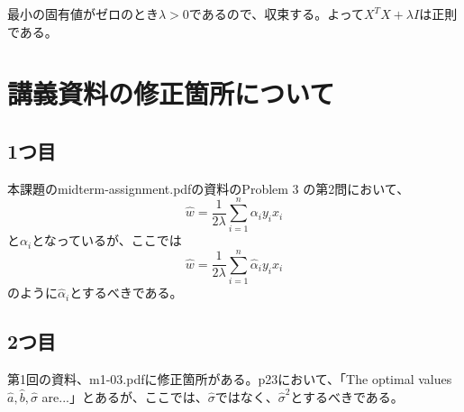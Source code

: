 \documentclass[a4j,11pt]{jarticle}
\begin{document}
最小の固有値がゼロのとき$\lambda > 0$であるので、収束する。よって$X^TX + \lambda I$は正則である。


\section*{講義資料の修正箇所について}
\subsection*{1つ目}
本課題のmidterm-assignment.pdfの資料のProblem 3 の第2問において、
\begin{equation*}
    \hat{w} = \frac{1}{2\lambda} \sum_{i=1}^n \alpha_i y_i x_i
\end{equation*}
と$\alpha_i$となっているが、ここでは
\begin{equation*}
    \hat{w} = \frac{1}{2\lambda} \sum_{i=1}^n \hat{\alpha}_i y_i x_i
\end{equation*}
のように$\hat{\alpha}_i$とするべきである。

\subsection*{2つ目}
第1回の資料、m1-03.pdfに修正箇所がある。p23において、「The optimal values $\hat{a},\hat{b},\hat{\sigma}$ are...」とあるが、ここでは、$\hat{\sigma}$ではなく、$\hat{\sigma}^2$とするべきである。
\end{document}
